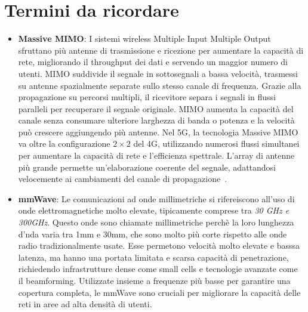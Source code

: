 \documentclass[english]{article}
\begin{document}
\section{Termini da ricordare}
\begin{itemize}
	\item \textbf{\hypertarget{MIMO}{Massive MIMO}}:
	      I sistemi wireless Multiple Input Multiple Output
	      sfruttano più antenne di trasmissione e ricezione per aumentare la capacità di rete,
	      migliorando il throughput dei dati e servendo un maggior numero di utenti. MIMO suddivide
	      il segnale in sottosegnali a bassa velocità, trasmessi su antenne spazialmente separate
	      sullo stesso canale di frequenza. Grazie alla propagazione su percorsi multipli, il
	      ricevitore separa i segnali in flussi paralleli per recuperare il segnale originale.
	      MIMO aumenta la capacità del canale senza consumare ulteriore larghezza di banda o
	      potenza e la velocità può crescere aggiungendo più antenne. Nel 5G, la tecnologia
	      Massive MIMO va oltre la configurazione $2 \times 2$ del 4G, utilizzando numerosi
	      flussi simultanei per aumentare la capacità di rete e l'efficienza spettrale.
	      L'array di antenne più grande permette un'elaborazione coerente del segnale, adattandosi
	      velocemente ai cambiamenti del canale di propagazione~\cite{Kathavate2021Critical}.

	\item \textbf{\hypertarget{mmWave}{mmWave}}:
	      Le comunicazioni ad onde millimetriche
	      si rifereiscono all'uso di onde elettromagnetiche molto elevate, tipicamente comprese
	      tra \textit{30 GHz e 300GHz}. Questo onde sono chiamate millimetriche perchè la loro
	      lunghezza d'nda varia tra 1mm e 30mm, che sono molto più corte rispetto alle onde radio
	      tradizionalmente usate. Esse permetono velocità molto elevate e basssa latenza, ma hanno
	      una portata limitata e scarsa capacità di penetrazione, richiedendo infrastrutture dense
	      come small cells e tecnologie avanzate come il beamforming. Utilizzate insieme
	      a frequenze più basse per garantire una copertura completa,
	      le mmWave sono cruciali per migliorare la capacità delle
	      reti in aree ad alta densità di utenti.


\end{itemize}
\end{document}

